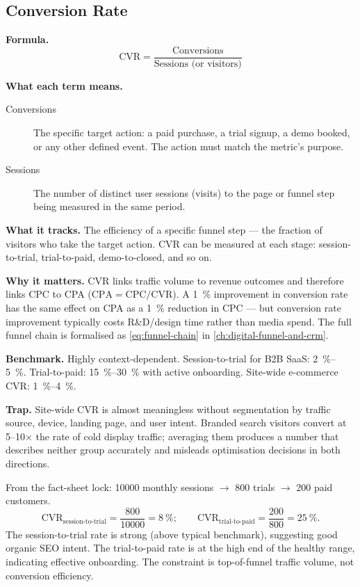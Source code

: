 \subsection{Conversion Rate}

\textbf{Formula.}
\[
  \mathrm{CVR} = \frac{\text{Conversions}}{\text{Sessions (or visitors)}}
\]

\textbf{What each term means.}
\begin{description}
  \item[Conversions] The specific target action: a paid purchase, a trial signup, a
    demo booked, or any other defined event. The action must match the metric's purpose.
  \item[Sessions] The number of distinct user sessions (visits) to the page or funnel step
    being measured in the same period.
\end{description}

\textbf{What it tracks.} The efficiency of a specific funnel step --- the fraction of
visitors who take the target action. CVR can be measured at each stage: session-to-trial,
trial-to-paid, demo-to-closed, and so on.

\textbf{Why it matters.} CVR links traffic volume to revenue outcomes and therefore links
CPC to CPA ($\mathrm{CPA} = \mathrm{CPC}/\mathrm{CVR}$). A \qty{1}{\percent} improvement
in conversion rate has the same effect on CPA as a \qty{1}{\percent} reduction in CPC ---
but conversion rate improvement typically costs R\&D/design time rather than media spend.
The full funnel chain is formalised as \cref{eq:funnel-chain} in \cref{ch:digital-funnel-and-crm}.

\textbf{Benchmark.} Highly context-dependent. Session-to-trial for B2B SaaS: \qty{2}{\percent}--\qty{5}{\percent}.
Trial-to-paid: \qty{15}{\percent}--\qty{30}{\percent} with active onboarding.
Site-wide e-commerce CVR: \qty{1}{\percent}--\qty{4}{\percent}.

\textbf{Trap.} Site-wide CVR is almost meaningless without segmentation by traffic source,
device, landing page, and user intent. Branded search visitors convert at 5--10$\times$ the
rate of cold display traffic; averaging them produces a number that describes neither group
accurately and misleads optimisation decisions in both directions.

\begin{example}
From the fact-sheet lock: \num{10000} monthly sessions $\to$ \num{800} trials
$\to$ \num{200} paid customers.
\[
  \mathrm{CVR}_{\text{session-to-trial}} = \frac{800}{10000} = \qty{8}{\percent}; \qquad
  \mathrm{CVR}_{\text{trial-to-paid}} = \frac{200}{800} = \qty{25}{\percent}.
\]
The session-to-trial rate is strong (above typical benchmark), suggesting good organic SEO
intent. The trial-to-paid rate is at the high end of the healthy range, indicating effective
onboarding. The constraint is top-of-funnel traffic volume, not conversion efficiency.
\end{example}


